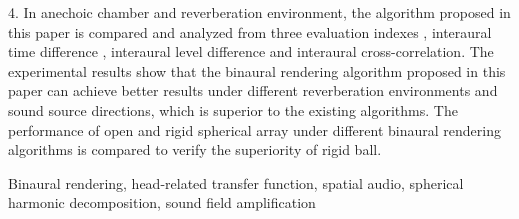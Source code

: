 \begin{Abstract}
	
	4. In anechoic chamber and reverberation environment, the algorithm proposed in this paper is compared and analyzed from three evaluation indexes , interaural time difference , interaural level difference and interaural cross-correlation. The experimental results show that the binaural rendering algorithm proposed in this paper can achieve better results under different reverberation environments and sound source directions, which is superior to the existing algorithms. The performance of open and rigid spherical array under different binaural rendering algorithms is compared to verify the superiority of rigid ball.
	
	
	\begin{Keywords}
		Binaural rendering, head-related transfer function, spatial audio, spherical harmonic decomposition, sound field amplification
	\end{Keywords}
\end{Abstract}